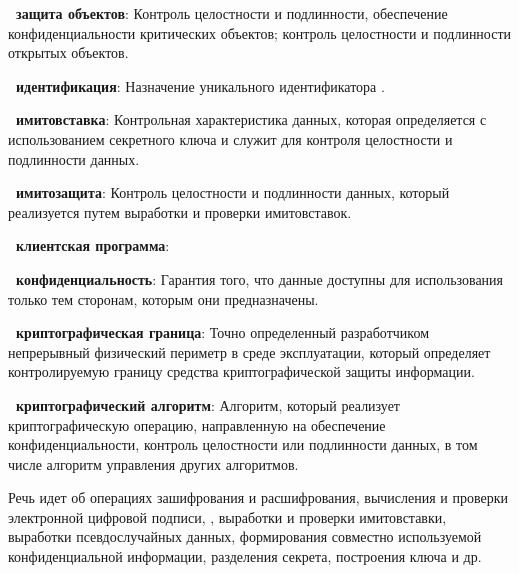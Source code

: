 {\bf \thedefctr~защита объектов}:
Контроль целостности и подлинности, обеспечение конфиденциальности критических
объектов; контроль целостности и подлинности открытых объектов.


{\bf \thedefctr~идентификация}:
Назначение уникального идентификатора
.


{\bf \thedefctr~имитовставка}:
Контрольная характеристика данных, которая определяется с использованием
секретного ключа и служит для контроля целостности и подлинности данных.

{\bf \thedefctr~имитозащита}:
Контроль целостности и подлинности данных, который реализуется путем выработки и
проверки имитовставок.

{\bf \thedefctr~клиентская программа}:

%

{\bf \thedefctr~конфиденциальность}:
Гарантия того, что данные доступны для использования
только тем сторонам, которым они предназначены.

{\bf \thedefctr~криптографическая граница}: 
Точно определенный разработчиком непрерывный физический периметр в среде
эксплуатации, который определяет контролируемую границу средства
криптографической защиты информации.


{\bf \thedefctr~криптографический алгоритм}:
Алгоритм, который реализует криптографическую операцию, направленную на
обеспечение конфиденциальности, контроль целостности или подлинности данных, в
том числе алгоритм управления  
других алгоритмов.

\begin{note}
Речь идет об операциях зашифрования и расшифрования, вычисления и проверки
электронной цифровой подписи, , выработки и проверки 
имитовставки, выработки псевдослучайных данных, формирования совместно 
используемой конфиденциальной информации, разделения секрета, 
построения ключа и др. 
\end{note}


